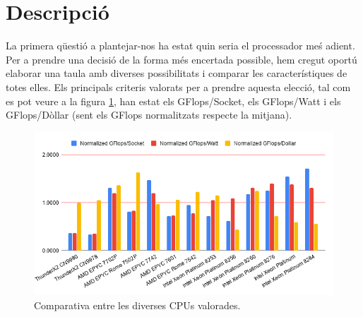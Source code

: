 \documentclass{article}
\begin{document}






\section{Descripció}

La primera qüestió a plantejar-nos ha estat quin seria el processador meś adient. Per a prendre una decisió de la forma més encertada possible, hem cregut oportú elaborar una taula amb diverses possibilitats i comparar les característiques de totes elles. Els principals criteris valorats per a prendre aquesta elecció, tal com es pot veure a la figura \ref{chartCPUs}, han estat els GFlops/Socket, els GFlops/Watt i els GFlops/Dòllar (sent els GFlops normalitzats respecte la mitjana). 

\begin{figure}[h]
    \centering
    \includegraphics[width=\textwidth]{entregable/fitxers/chartCPU}
    \caption{Comparativa entre les diverses CPUs valorades.}
    \label{chartCPUs}
\end{figure}
\end{document}
